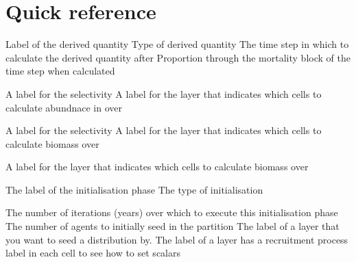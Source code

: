 \section{Quick reference\label{sec:quick-reference}}
\par
{} {Label of the derived quantity}
 {Type of derived quantity}
 {The time step in which to calculate the derived quantity after}
 {Proportion through the mortality block of the time step when calculated}
\par\textbf{}\par
{} {A label for the selectivity}
 {A label for the layer that indicates which cells to calculate abundnace in over}
\par\textbf{}\par
{} {A label for the selectivity}
 {A label for the layer that indicates which cells to calculate biomass over}
\par\textbf{}\par
\par\textbf{}\par
{} {A label for the layer that indicates which cells to calculate biomass over}
\par\par
{} {The label of the initialisation phase}
 {The type of initialisation}
\par\textbf{}\par
{} {The number of iterations (years) over which to execute this initialisation phase}
 {The number of agents to initially seed in the partition}
 {The label of a layer that you want to seed a distribution by.}
 {The label of a layer has a recruitment process label in each cell to see how to set scalars}
\par\par
